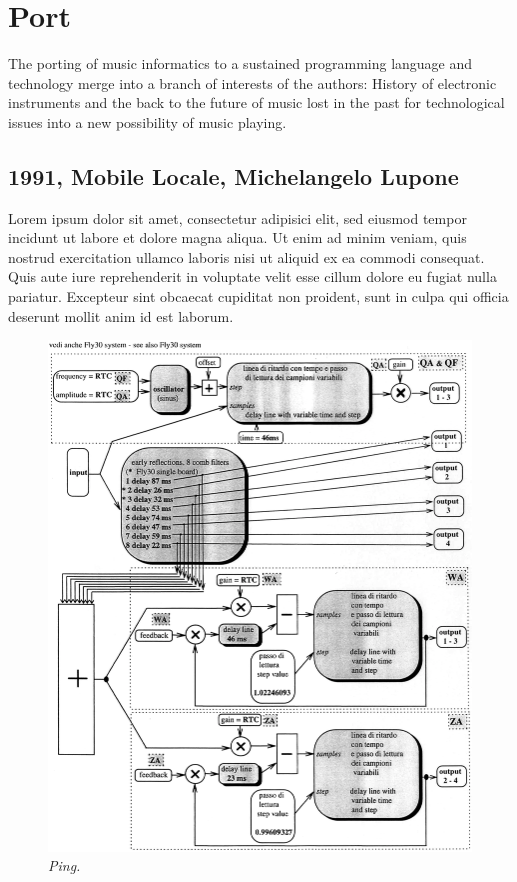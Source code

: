 \documentclass[twoside,a4paper]{article}
\begin{document}
\section{Port}
\label{sec:porting}

The porting of music informatics to a sustained programming language and technology merge into a branch of interests of the authors: History of electronic instruments and the back to the future of music lost in the past for technological issues into a new possibility of music playing. 

\subsection{1991, Mobile Locale, Michelangelo Lupone}

Lorem ipsum dolor sit amet, consectetur adipisici elit, sed eiusmod tempor
incidunt ut labore et dolore magna aliqua. Ut enim ad minim veniam, quis
nostrud exercitation ullamco laboris nisi ut aliquid ex ea commodi consequat.
Quis aute iure reprehenderit in voluptate velit esse cillum dolore eu fugiat
nulla pariatur. Excepteur sint obcaecat cupiditat non proident, sunt in culpa
qui officia deserunt mollit anim id est laborum.

\begin{figure}[ht]
\centerline{\includegraphics[scale=0.5]{img/1991-lm-mobilelocale-diagram1.png}}
\caption{\label{fft_plot}{\it Ping.}}
\end{figure}
\end{document}
